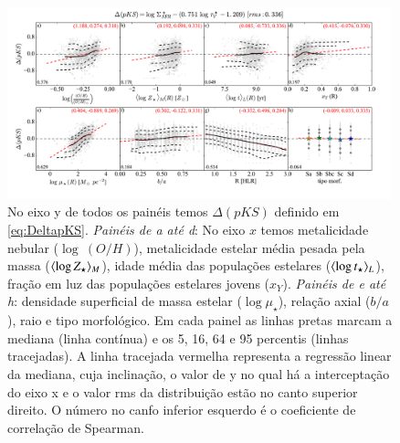 \begin{figure}
	\centering
	\includegraphics[width=0.99\textwidth]{figuras/deltapKS.pdf}
	\caption[Resíduos da {\em pseudo-KS}.]
	{No eixo y de todos os painéis temos $\Delta(pKS)$ definido em \eqref{eq:DeltapKS}. \emph{Painéis
de a até d}: No eixo $x$ temos metalicidade nebular ($\log\ (O/H)$), metalicidade estelar média
pesada pela massa ($\meanM{\log Z_\star}$), idade média das populações estelares ($\meanL{\log
t_\star}$), fração em luz das populações estelares jovens ($x_Y$). \emph{Painéis de e até h}:
densidade superficial de massa estelar ($\log \mu_\star$), relação axial ($b/a$), raio e tipo
morfológico. Em cada painel as linhas pretas marcam a mediana (linha contínua) e os 5, 16, 64 e 95
percentis (linhas tracejadas). A linha tracejada vermelha representa a regressão linear da mediana,
cuja inclinação, o valor de y no qual há a interceptação do eixo x e o valor rms da distribuição
estão no canto superior direito. O número no canfo inferior esquerdo é o coeficiente de correlação
de Spearman.}
	\label{fig:deltapKS}
\end{figure}

